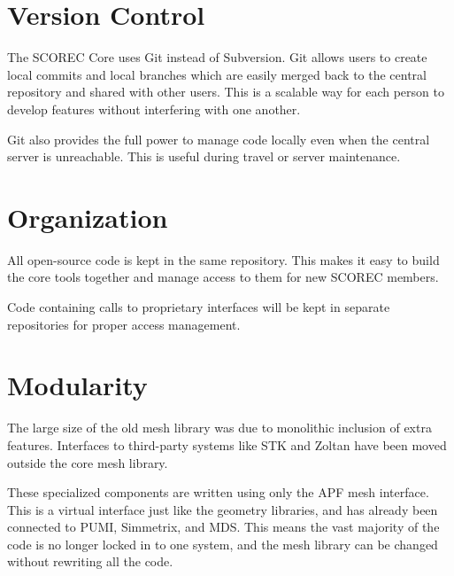 \documentclass{article}
\begin{document}
\section{Version Control}

The SCOREC Core uses Git instead of Subversion.
Git allows users to create local commits and local branches
which are easily merged back to the central repository
and shared with other users.
This is a scalable way for each person to develop features
without interfering with one another.

Git also provides the full power to manage code locally even
when the central server is unreachable.
This is useful during travel or server maintenance.

\section{Organization}

All open-source code is kept in the same repository.
This makes it easy to build the core tools together
and manage access to them for new SCOREC members.

Code containing calls to proprietary interfaces will
be kept in separate repositories for proper access management.

\section{Modularity}

The large size of the old mesh library was due to monolithic
inclusion of extra features.
Interfaces to third-party systems like STK and Zoltan have
been moved outside the core mesh library.

These specialized components are written using only the APF mesh
interface.
This is a virtual interface just like the geometry libraries,
and has already been connected to PUMI, Simmetrix, and MDS.
This means the vast majority of the code is no longer locked in
to one system, and the mesh library can be changed without
rewriting all the code.
\end{document}
